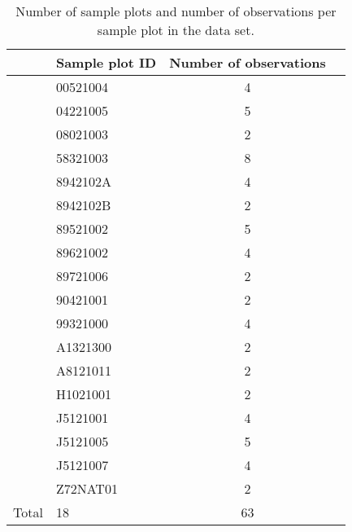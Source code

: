 \newpage{}  %
\begin{singlespace}
  {\tabulinesep=2mm
    \begin{longtabu}{l l S L}
      \caption{Number of sample plots and number of observations per sample plot in the \beech{} data set. \label{tab:observations_count_per_edvid_beech}} \\
      \toprule
      & Sample plot ID & {Number of observations} &  \\
      \midrule
      \endhead
      \bottomrule
      \endlastfoot
      & 00521004 & 4 \\
      & 04221005 & 5 \\
      & 08021003 & 2 \\
      & 58321003 & 8 \\
      & 8942102A & 4 \\
      & 8942102B & 2 \\
      & 89521002 & 5 \\
      & 89621002 & 4 \\
      & 89721006 & 2 \\
      & 90421001 & 2 \\
      & 99321000 & 4 \\
      & A1321300 & 2 \\
      & A8121011 & 2 \\
      & H1021001 & 2 \\
      & J5121001 & 4 \\
      & J5121005 & 5 \\
      & J5121007 & 4 \\
      & Z72NAT01 & 2 \\
      Total & 18 & 63 \\
    \end{longtabu}
  }
\end{singlespace}


